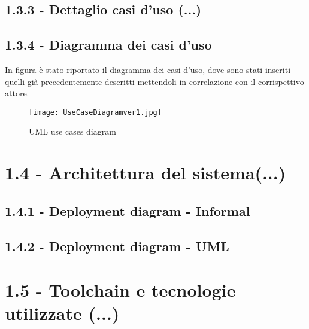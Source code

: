 \subsection*{1.3.3 - Dettaglio casi d'uso (...)}
\par 

\newpage
\subsection*{1.3.4 - Diagramma dei casi d'uso}
In figura è stato riportato il diagramma dei casi d’uso, dove sono stati inseriti quelli già precedentemente descritti mettendoli in correlazione con il corrispettivo attore.
    \begin{figure}[H]
        \centering
        \texttt{[image: UseCaseDiagramver1.jpg]}
        \caption[]{UML use cases diagram}
    \end{figure}

\newpage

\section*{1.4 - Architettura del sistema(...)} 






\subsection*{1.4.1 - Deployment diagram - Informal}






\subsection*{1.4.2 - Deployment diagram - UML}






\newpage

\section*{1.5 - Toolchain e tecnologie utilizzate (...)}